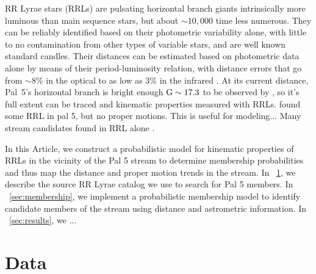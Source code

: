 \documentclass[twocolumn]{aastex63}
\begin{document}
RR Lyrae stars (RRLs) are pulsating horizontal branch giants intrinsically more luminous than main sequence stars, but about $\sim 10,000$ time less numerous. They can be reliably identified based on their photometric variability alone, with little to no contamination from other types of variable stars, and are well known standard candles. Their distances can be estimated based on photometric data alone by means of their period-luminosity relation, with distance errors that go from $\sim8\%$ in the optical to as low as 3\% in the infrared \citep{Neely2017,Sesar2017a}. At its current distance, Pal~5's horizontal branch is bright enough ${\mathrm{G}}\sim17.3$ to be observed by \Gaia, so it's full extent can be traced and kinematic properties measured with RRLs.
\citep{Ibata:2017} found some RRL in pal 5, but no proper motions.
This is useful for modeling...
Many stream candidates found in RRL alone \citep{Mateu:2018}.

In this Article, we construct a probabilistic model for kinematic properties of RRLs in the vicinity of the Pal 5 stream to determine membership probabilities and thus map the distance and proper motion trends in the stream.
In \sectionname~\ref{sec:data}, we describe the source RR Lyrae catalog we use to search for Pal 5 members.
In \sectionname~\ref{sec:membership}, we implement a probabilistic membership model to identify candidate members of the stream using distance and astrometric information.
In \sectionname~\ref{sec:results}, we ...


\section{Data} \label{sec:data}

\end{document}
